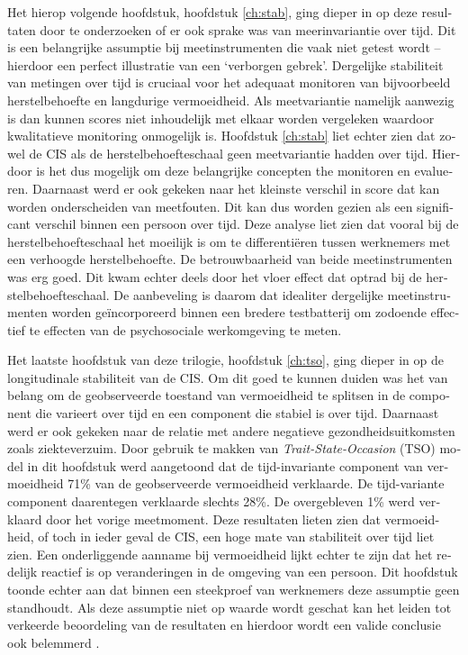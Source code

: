 \begin{otherlanguage}{dutch}
Het hierop volgende hoofdstuk, hoofdstuk \ref{ch:stab}, ging dieper in op deze resultaten door te onderzoeken of er ook sprake was van meerinvariantie over tijd. Dit is een belangrijke assumptie bij meetinstrumenten die vaak niet getest wordt -- hierdoor een perfect illustratie van een `verborgen gebrek'. Dergelijke stabiliteit van metingen over tijd is cruciaal voor het adequaat monitoren van bijvoorbeeld herstelbehoefte en langdurige vermoeidheid. Als meetvariantie namelijk aanwezig is dan kunnen scores niet inhoudelijk met elkaar worden vergeleken waardoor kwalitatieve monitoring onmogelijk is. Hoofdstuk \ref{ch:stab} liet echter zien dat zowel de CIS als de herstelbehoefteschaal geen meetvariantie hadden over tijd. Hierdoor is het dus mogelijk om deze belangrijke concepten the monitoren en evalueren. Daarnaast werd er ook gekeken naar het kleinste verschil in score dat kan worden onderscheiden van meetfouten. Dit kan dus worden gezien als een significant verschil binnen een persoon over tijd. Deze analyse liet zien dat vooral bij de herstelbehoefteschaal het moeilijk is om te differenti\"eren tussen werknemers met een verhoogde herstelbehoefte. De betrouwbaarheid van beide meetinstrumenten was erg goed. Dit kwam echter deels door het vloer effect dat optrad bij de herstelbehoefteschaal. De aanbeveling is daarom dat idealiter dergelijke meetinstrumenten worden ge\"incorporeerd binnen een bredere testbatterij om zodoende effectief te effecten van de psychosociale werkomgeving te meten. 

Het laatste hoofdstuk van deze trilogie, hoofdstuk \ref{ch:tso}, ging dieper in op de longitudinale stabiliteit van de CIS. Om dit goed te kunnen duiden was het van belang om de geobserveerde toestand van vermoeidheid te splitsen in de component die varieert over tijd en een component die stabiel is over tijd. Daarnaast werd er ook gekeken naar de relatie met andere negatieve gezondheidsuitkomsten zoals ziekteverzuim. Door gebruik te makken van \textit{Trait-State-Occasion} (TSO) model  \parencite{Prenoveau_2011,Prenoveau_2016} in dit hoofdstuk werd aangetoond dat de tijd-invariante component van vermoeidheid 71\% van de geobserveerde vermoeidheid verklaarde. De tijd-variante component daarentegen verklaarde slechts 28\%. De overgebleven 1\% werd verklaard door het vorige meetmoment. Deze resultaten lieten zien dat vermoeidheid, of toch in ieder geval de CIS, een hoge mate van stabiliteit over tijd liet zien. Een onderliggende aanname bij vermoeidheid lijkt echter te zijn dat het redelijk reactief is op veranderingen in de omgeving van een persoon. Dit hoofdstuk toonde echter aan dat binnen een steekproef van werknemers deze assumptie geen standhoudt. Als deze assumptie niet op waarde wordt geschat kan het leiden tot verkeerde beoordeling van de resultaten en hierdoor wordt een valide conclusie ook belemmerd \parencite{Hamaker_2015}.


\end{otherlanguage}
